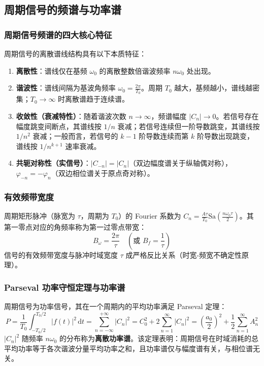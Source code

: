 \documentclass[11pt,a4paper,fontset=fandol]{ctexart}
\theoremstyle{remark}
\begin{document}
\subsection{周期信号的频谱与功率谱}

\subsubsection{周期信号频谱的四大核心特征}
周期信号的离散谱线结构具有以下本质特征：
\begin{enumerate}
    \item \textbf{离散性}：谱线仅在基频 $\omega_0$ 的离散整数倍谐波频率 $n\omega_0$ 处出现。
    \item \textbf{谐波性}：谱线间隔为基波角频率 $\omega_0 = \frac{2\pi}{T_0}$。周期 $T_0$ 越大，基频越小，谱线越密集；$T_0 \to \infty$ 时离散谱趋于连续谱。
    \item \textbf{收敛性（衰减特性）}：随着谐波次数 $n \to \infty$，频谱幅度 $|C_n| \to 0$。若信号存在幅度跳变间断点，其谱线按 $1/n$ 衰减；若信号连续但一阶导数跳变，其谱线按 $1/n^2$ 衰减；一般而言，若信号的 $k-1$ 阶导数连续而第 $k$ 阶导数出现跳变，谱线按 $1/n^{k+1}$ 速率衰减。
    \item \textbf{共轭对称性（实信号）}：$|C_{-n}| = |C_n|$（双边幅度谱关于纵轴偶对称），$\varphi_{-n} = -\varphi_n$（双边相位谱关于原点奇对称）。
\end{enumerate}

\subsubsection{有效频带宽度}
周期矩形脉冲（脉宽为 $\tau$，周期为 $T_0$）的 Fourier 系数为 $C_n = \frac{A\tau}{T_0}\mathrm{Sa}\left(\frac{n\omega_0\tau}{2}\right)$。其第一零点对应的角频率称为第一过零点带宽：
\begin{equation}
    B_\omega = \frac{2\pi}{\tau} \quad (\text{或 } B_f = \frac{1}{\tau})
\end{equation}
信号的有效频带宽度与脉冲时域宽度 $\tau$ 成严格反比关系（时宽-频宽不确定性原理）。

\subsubsection{Parseval 功率守恒定理与功率谱}
周期信号为功率信号，其在一个周期内的平均功率满足 Parseval 定理：
\begin{equation}
    P = \frac{1}{T_0} \int_{-T_0/2}^{T_0/2} |f(t)|^2\,\mathrm{d}t = \sum_{n=-\infty}^{+\infty} |C_n|^2 = C_0^2 + 2\sum_{n=1}^\infty |C_n|^2 = \left(\frac{a_0}{2}\right)^2 + \frac{1}{2}\sum_{n=1}^\infty A_n^2
\end{equation}
$|C_n|^2$ 随频率 $n\omega_0$ 的分布称为\textbf{离散功率谱}。该定理表明：周期信号在时域消耗的总平均功率等于各次谐波分量平均功率之和，且功率谱仅与幅度谱有关，与相位谱无关。
\end{document}
